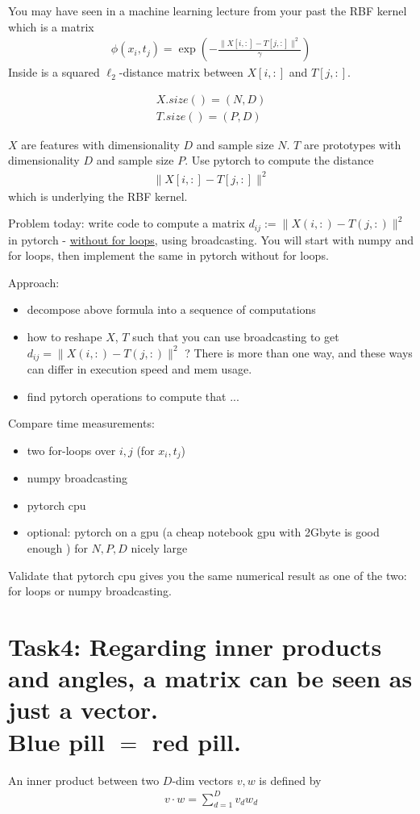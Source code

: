 \documentclass{article}
\newcommand{\eqn}[1]{\begin{align*}#1\end{align*}}%
\newcommand{\bi}[1]{\begin{itemize}#1\end{itemize}}
\newcommand{\s}{ \\\vspace{3mm} }
\begin{document}
You may have seen in a machine learning lecture from your past the RBF kernel which is a matrix
\eqn{
\phi(x_i,t_j) = \exp(- \frac{\|X[i,:]-T[j,:] \|^2 }{\gamma} )
}
Inside is a squared $\ell_2$-distance matrix between $X[i,:]$ and $T[j,:]$.

\eqn{
X.size()=(N,D)\\
T.size()=(P,D)
}

$X$ are features with dimensionality $D$ and sample size $N$. $T$ are prototypes with dimensionality $D$ and sample size $P$. Use pytorch to compute the distance 
\eqn{
 \|X[i,:]-T[j,:] \|^2
}
which is underlying the RBF kernel.\s

Problem today: write code to compute a matrix $ d_{ij}:= \|X(i,:)-T(j,:)\|^2 $ in pytorch - \underline{without for loops}, using broadcasting. You will start with numpy and for loops, then implement the same in pytorch without for loops.

Approach:
\bi{
\item decompose above formula into a sequence of computations
\item how to reshape $X$, $T$ such that you can use broadcasting to get $d_{ij}=\|X(i,:)-T(j,:)\|^2$ ? There is more than one way, and these ways can differ in execution speed and mem usage.
\item find pytorch operations to compute that ...
}

Compare time measurements:
\bi{
\item two for-loops over $i,j$ (for $x_i,t_j$)
\item numpy broadcasting
\item pytorch cpu
\item optional: pytorch on a gpu (a cheap notebook gpu with 2Gbyte is good enough ) for $N,P,D$ nicely large
}
Validate that pytorch cpu gives you the same numerical result as one of the two: for loops or numpy broadcasting.\s





\section{Task4: Regarding inner products and angles, a matrix can be seen as just a vector.\\ Blue pill $=$ red pill.}

An inner product between two $D$-dim vectors $v,w$ is defined by 
\begin{align}
v \cdot w = \sum_{d=1}^D v_d w_d \label{eq:innerprod}
\end{align}
\end{document}
